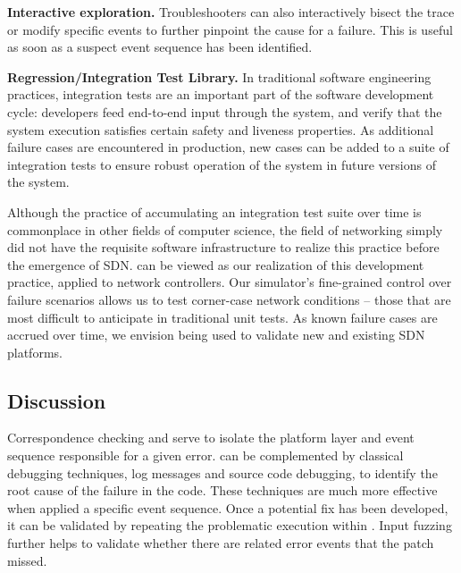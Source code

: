 \textbf{Interactive exploration.} Troubleshooters can also interactively bisect
the trace or modify specific events to further pinpoint the cause for a failure.
This is useful as soon as a suspect event sequence has been identified.

\textbf{Regression/Integration Test Library.} In traditional software engineering practices,
integration tests are an
important part of the software development cycle: developers feed end-to-end
input through the system, and verify that the system execution satisfies
certain safety and liveness properties. As additional failure cases are encountered in
production, new cases can be added to a suite of integration tests to
ensure robust operation of the system in future versions of the system.

Although the practice of accumulating an integration test suite over time is
commonplace in other fields of computer science, the field of networking
simply did not have the requisite software infrastructure to realize this practice before the emergence
of SDN. \Simulator{} can be viewed as our realization
of this development practice, applied to network controllers. Our simulator's fine-grained control over
failure scenarios allows us to test corner-case network conditions -- those
that are most difficult to anticipate in traditional unit tests.
As known failure cases are accrued over time, we envision \simulator{} being used to validate
new and existing SDN platforms. 

\subsection{Discussion}

Correspondence checking and \simulator{} serve to isolate the platform layer and
event sequence responsible for a given error. \projectname{} can be
complemented by classical debugging techniques, \eg{} log messages and source
code debugging, to identify the root cause of
the failure in the code. These techniques are much more
effective when applied a specific event sequence. Once a
potential fix has been developed, it can be validated by repeating the
problematic execution within \projectname{}. Input fuzzing further helps to
validate whether there are 
related error events that the patch missed.
